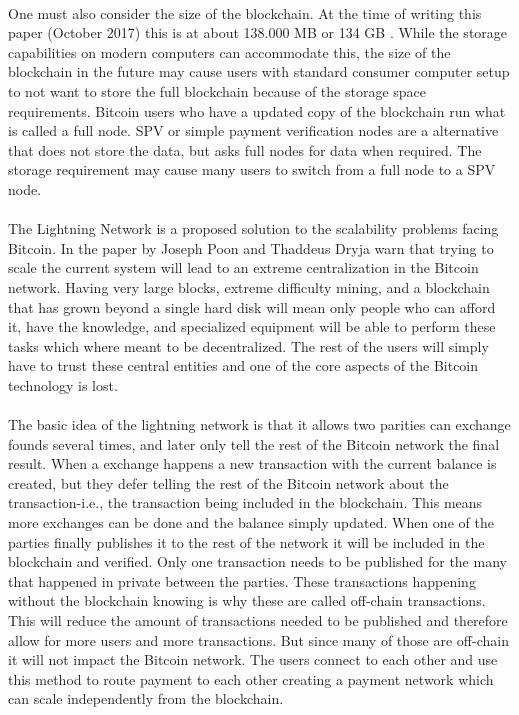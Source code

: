 \documentclass[informationsecurity]{gucmasterproject}
\begin{document}
\paragraph{}
One must also consider the size of the blockchain. At the time of writing this paper (October 2017) this is at about 138.000 MB or 134 GB \cite{blockchain_size}. While the storage capabilities on modern computers can accommodate this, the size of the blockchain in the future may cause users with standard consumer computer setup to not want to store the full blockchain because of the storage space requirements. Bitcoin users who have a updated copy of the blockchain run what is called a full node. SPV or simple payment verification nodes are a alternative that does not store the data, but asks full nodes for data when required. The storage requirement may cause many users to switch from a full node to a SPV node. 

\paragraph{}
The Lightning Network is a proposed solution to the scalability problems facing Bitcoin.
In the paper by Joseph Poon and Thaddeus Dryja \cite{poon2015bitcoin} warn that trying to scale the current system will lead to an extreme centralization in the Bitcoin network.
Having very large blocks, extreme difficulty mining, and a blockchain that has grown beyond a single hard disk will mean only people who can afford it, have the knowledge, and specialized equipment will be able to perform these tasks which where meant to be decentralized. The rest of the users will simply have to trust these central entities and one of the core aspects of the Bitcoin technology is lost.

\paragraph{}
The basic idea of the lightning network is that it allows two parities can exchange founds several times, and later only tell the rest of the Bitcoin network the final result.
When a exchange happens a new transaction with the current balance is created, but they defer telling the rest of the Bitcoin network about the transaction-i.e., the transaction being included in the blockchain. This means more exchanges can be done and the balance simply updated.
When one of the parties finally publishes it to the rest of the network it will be included in the blockchain and verified. Only one transaction needs to be published for the many that happened in private between the parties. These transactions happening without the blockchain knowing is why these are called off-chain transactions. This will reduce the amount of transactions needed to be published and therefore allow for more users and more transactions. But since many of those are off-chain it will not impact the Bitcoin network. The users connect to each other and use this method to route payment to each other creating a payment network which can scale independently from the blockchain.
\end{document}
